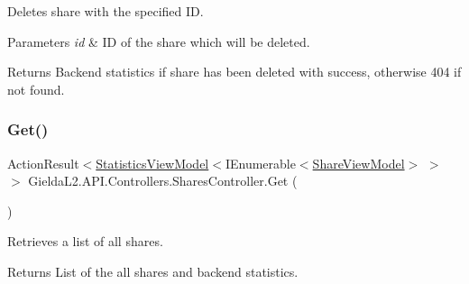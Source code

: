Deletes share with the specified ID. 


\begin{DoxyParams}{Parameters}
{\em id} & ID of the share which will be deleted.\\
\hline
\end{DoxyParams}
\begin{DoxyReturn}{Returns}
Backend statistics if share has been deleted with success, otherwise 404 if not found.
\end{DoxyReturn}
\mbox{\label{class_gielda_l2_1_1_a_p_i_1_1_controllers_1_1_shares_controller_a7a4e1916ed4b83d7cacfb17d0e1e56de}} 
\subsubsection{\texorpdfstring{Get()}{Get()}\hspace{0.1cm}{\footnotesize\ttfamily [1/2]}}
{\footnotesize\ttfamily Action\+Result$<$\mbox{\hyperlink{class_gielda_l2_1_1_a_p_i_1_1_view_models_1_1_view_1_1_statistics_view_model}{Statistics\+View\+Model}}$<$I\+Enumerable$<$\mbox{\hyperlink{class_gielda_l2_1_1_a_p_i_1_1_view_models_1_1_view_1_1_share_view_model}{Share\+View\+Model}}$>$ $>$ $>$ Gielda\+L2.\+A\+P\+I.\+Controllers.\+Shares\+Controller.\+Get (\begin{DoxyParamCaption}{ }\end{DoxyParamCaption})}



Retrieves a list of all shares. 

\begin{DoxyReturn}{Returns}
List of the all shares and backend statistics.
\end{DoxyReturn}
\mbox{\label{class_gielda_l2_1_1_a_p_i_1_1_controllers_1_1_shares_controller_acb86566291d689294a362a56accaa2a0}} 
